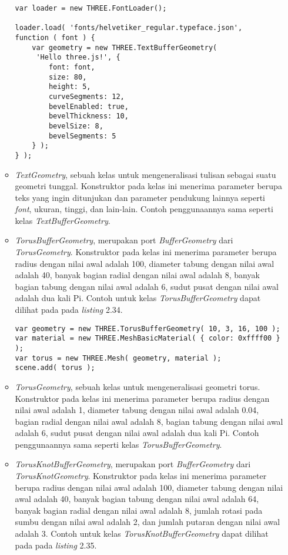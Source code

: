 \begin{itemize}
\begin{itemize}
\begin{lstlisting}[caption={Contoh penggunaan kelas {\it TextBufferGeometry}.},captionpos=b]
var loader = new THREE.FontLoader();

loader.load( 'fonts/helvetiker_regular.typeface.json',
function ( font ) {
	var geometry = new THREE.TextBufferGeometry(
	 'Hello three.js!', {
		font: font,
		size: 80,
		height: 5,
		curveSegments: 12,
		bevelEnabled: true,
		bevelThickness: 10,
		bevelSize: 8,
		bevelSegments: 5
	} );
} );
\end{lstlisting}

	\item {\it TextGeometry},  sebuah kelas untuk mengeneralisasi tulisan sebagai suatu geometri tunggal. Konstruktor pada kelas ini menerima parameter berupa teks yang ingin ditunjukan dan parameter pendukung lainnya seperti {\it font}, ukuran, tinggi, dan lain-lain. Contoh penggunaannya sama seperti kelas {\it TextBufferGeometry}.
	
	\item {\it TorusBufferGeometry}, merupakan port {\it BufferGeometry} dari {\it TorusGeometry}. Konstruktor pada kelas ini menerima parameter berupa radius dengan nilai awal adalah 100, diameter tabung dengan nilai awal adalah 40, banyak bagian radial dengan nilai awal adalah 8, banyak bagian tabung dengan nilai awal adalah 6, sudut pusat dengan nilai awal adalah dua kali Pi.  Contoh untuk kelas {\it TorusBufferGeometry} dapat dilihat pada pada {\it listing} 2.34.
	
\begin{lstlisting}[caption={Contoh penggunaan kelas {\it TorusBufferGeometry}.},captionpos=b]
var geometry = new THREE.TorusBufferGeometry( 10, 3, 16, 100 );
var material = new THREE.MeshBasicMaterial( { color: 0xffff00 } );
var torus = new THREE.Mesh( geometry, material );
scene.add( torus );
\end{lstlisting}

	\item {\it TorusGeometry}, sebuah kelas untuk mengeneralisasi geometri torus. Konstruktor pada kelas ini menerima parameter berupa radius dengan nilai awal adalah 1, diameter tabung dengan nilai awal adalah 0.04, bagian radial dengan nilai awal adalah 8, bagian tabung dengan nilai awal adalah 6, sudut pusat dengan nilai awal adalah dua kali Pi.  Contoh penggunaannya sama seperti kelas {\it TorusBufferGeometry}.
	
	\item {\it TorusKnotBufferGeometry}, merupakan port {\it BufferGeometry} dari {\it TorusKnotGeometry}. Konstruktor pada kelas ini menerima parameter berupa radius dengan nilai awal adalah 100, diameter tabung dengan nilai awal adalah 40, banyak bagian tabung dengan nilai awal adalah 64, banyak bagian radial dengan nilai awal adalah 8, jumlah rotasi pada sumbu dengan nilai awal adalah 2, dan jumlah putaran dengan nilai awal adalah 3. Contoh untuk kelas {\it TorusKnotBufferGeometry} dapat dilihat pada pada {\it listing} 2.35.
	

\end{itemize}
\end{itemize}
